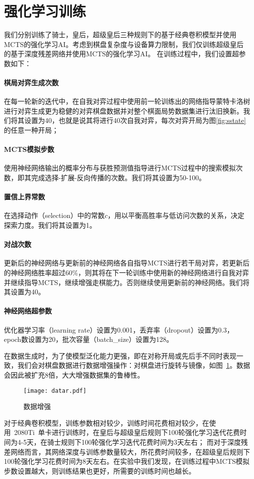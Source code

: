 \section{强化学习训练}
我们分别训练了骑士，皇后，超级皇后三种规则下的基于经典卷积模型并使用MCTS的强化学习AI。考虑到棋盘复杂度与设备算力限制，我们仅训练超级皇后的基于深度残差网络并使用MCTS的强化学习AI。
在训练过程中，我们设置超参数如下：
\paragraph{棋局对弈生成次数}
在每一轮新的迭代中，在自我对弈过程中使用前一轮训练出的网络指导蒙特卡洛树进行对弈生成更为稳健的对弈棋盘数据并对整个棋面局势数据集进行汰旧换新。我们将其设置为40，也就是说其将进行40次自我对弈，每次对弈开局为图\ref{fig:sstate}的任意一种开局；
\paragraph{MCTS模拟步数}
使用神经网络输出的概率分布与获胜预测值指导进行MCTS过程中的搜索模拟次数，即其完成选择-扩展-反向传播的次数。我们将其设置为50-100。
\paragraph{置信上界常数}
在选择动作（selection）中的常数$c$，用以平衡高胜率与低访问次数的关系，决定探索力度。我们将其设置为1。
\paragraph{对战次数}
更新后的神经网络与更新前的神经网络各自指导MCTS进行若干局对弈，若更新后的神经网络胜率超过$60\%$，则其将在下一轮训练中使用新的神经网络进行自我对弈并继续指导MCTS，继续增强走棋能力。否则继续使用更新前的神经网络。我们将其设置为40。
\paragraph{神经网络超参数}
优化器学习率（learning rate）设置为0.001，丢弃率（dropout）设置为0.3，epoch数设置为20，批次容量（batch\_size）设置为128。


在数据生成时，为了使模型泛化能力更强，即在对称开局或先后手不同时表现一致，我们会对棋盘数据进行数据增强操作：对棋盘进行旋转与镜像，如图~\ref{fig:datar}。数据会因此被扩充8倍，大大增强数据集的鲁棒性。
\begin{figure}[H]
    \centering
    \texttt{[image: datar.pdf]}
    \caption[datar]{%
        数据增强%
      }
    \label{fig:datar}
\end{figure}
对于经典卷积模型，训练参数相对较少，训练时间花费相对较少，在使用~2080Ti~单卡进行训练时，在皇后与超级皇后规则下100轮强化学习迭代花费时间为4-5天，在骑士规则下100轮强化学习迭代花费时间为3天左右；
而对于深度残差网络而言，其网络深度与训练参数量较大，所花费时间较多，在超级皇后规则下100轮强化学习花费时间为8天左右。在实验中我们发现，在训练过程中MCTS模拟步数设置越大，则训练结果也更好，所需要的训练时间也越长。

